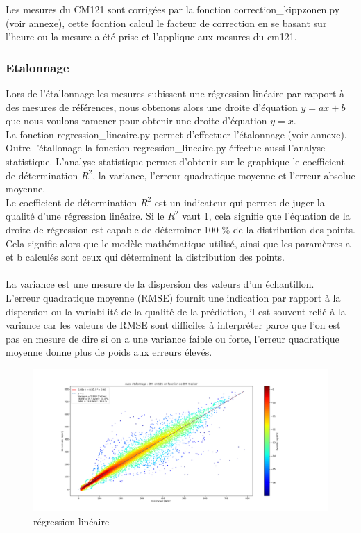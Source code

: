 \documentclass[12pt,a4paper]{article}
\begin{document}
\begin{flushleft}
Les mesures du CM121 sont corrigées par la fonction correction\_kippzonen.py (voir annexe), cette focntion calcul le facteur de correction en se basant sur l'heure ou la mesure a été prise et l'applique aux mesures du cm121.

\subsubsection{Etalonnage}

Lors de l'étallonnage les mesures subissent une régression linéaire par rapport à des mesures de références, nous obtenons alors une droite d'équation $y = ax + b$ que nous voulons ramener pour obtenir une droite d'équation $y = x$.\\

La fonction regression\_lineaire.py permet d'effectuer l'étalonnage (voir annexe). Outre l'étallonage la fonction regression\_lineaire.py éffectue aussi l'analyse statistique. L'analyse statistique permet d'obtenir sur le graphique le coefficient de détermination $R^2$, la variance, l'erreur quadratique moyenne et  l'erreur absolue moyenne.\\

Le coefficient de détermination $R^2$ est un indicateur qui permet de juger la qualité d’une régression linéaire. Si le $R^2$ vaut 1, cela signifie que l’équation de la droite de régression est capable de déterminer 100 \% de la distribution des points. Cela signifie alors que le modèle mathématique utilisé, ainsi que les paramètres a et b calculés sont ceux qui déterminent la distribution des points.\\
~~\\
La variance est une mesure de la dispersion des valeurs d'un échantillon.
~~\\
L'erreur quadratique moyenne (RMSE) fournit une indication par rapport à la dispersion ou la variabilité de la qualité de la prédiction, il est souvent relié à la variance car les valeurs de RMSE sont difficiles à interpréter parce que l’on est pas en mesure de dire si on a une variance faible ou forte, l'erreur quadratique moyenne donne plus de poids aux erreurs élevés.
~\\ 

\begin{figure}[H]
\centering
\includegraphics[width=15cm]{image/etallonnage/1.png} 
\caption{régression linéaire}  
\end{figure}


\end{flushleft}
\end{document}
